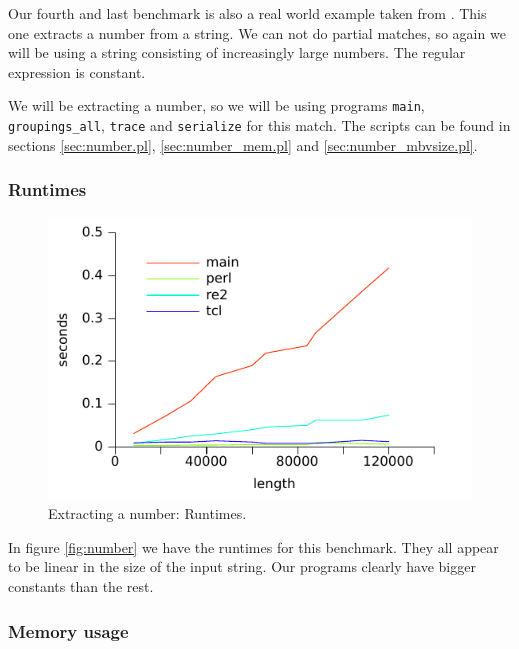 Our fourth and last benchmark is also a real world example taken from
\cite{veanes}. This one extracts a number from a string. We can not do
partial matches, so again we will be using a string consisting of
increasingly large numbers. The regular expression is constant.

We will be extracting a number, so we will be using programs
\texttt{main}, \texttt{groupings\_all}, \texttt{trace} and
\texttt{serialize} for this match. The scripts can be found in
sections \vref{sec:number.pl}, \vref{sec:number_mem.pl} and
\vref{sec:number_mbvsize.pl}.


\subsubsection{Runtimes}

\begin{figure}
\centering
\includegraphics{benchmarks/number.pdf}
\caption{Extracting a number: Runtimes.}
\label{fig:number}
\end{figure}

In figure \vref{fig:number} we have the runtimes for this
benchmark. They all appear to be linear in the size of the input
string. Our programs clearly have bigger constants than the rest. 


\subsubsection{Memory usage}


